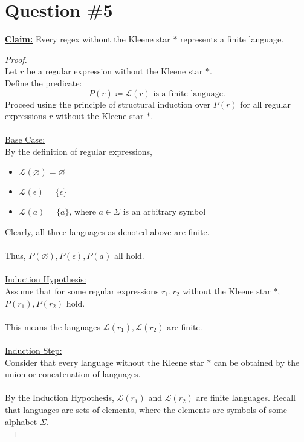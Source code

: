 \documentclass[12pt]{article}
\begin{document}
\section*{Question \#5}
\textbf{\underline{Claim:}} Every regex without the Kleene star \( * \) represents a finite language.
\begin{proof}
\leavevmode\\
    Let \( r \) be a regular expression without the Kleene star \( * \). \\
    Define the predicate:
    \[
        P(r) \coloneq \mathcal{L}(r) \text{ is a finite language.}
    \]
    Proceed using the principle of structural induction over \( P(r) \) for all regular expressions \( r \) without the Kleene star \( *\). \\
    \\
    \underline{Base Case:} \\
    By the definition of regular expressions,
    \begin{itemize}
        \item \( \mathcal{L}(\varnothing) = \varnothing \)
        \item \( \mathcal{L}(\epsilon) = \{ \epsilon \} \)
        \item \( \mathcal{L}(a) = \{ a \} \), where \( a \in \Sigma \) is an arbitrary symbol 
    \end{itemize}
    Clearly, all three languages as denoted above are finite. \\
    \\
    Thus, \( P(\varnothing), P(\epsilon), P(a) \) all hold. \\
    \\
    \underline{Induction Hypothesis:} \\
    Assume that for some regular expressions \( r_1, r_2 \) without the Kleene star \( * \), \( P(r_1), P(r_2) \) hold. \\
    \\
    This means the languages \( \mathcal{L}(r_1), \mathcal{L}(r_2) \) are finite. \\
    \\
    \underline{Induction Step:} \\
    Consider that every language without the Kleene star \( * \) can be obtained by the union or concatenation of languages. \\
    \\
    By the Induction Hypothesis, \( \mathcal{L}(r_1) \) and \( \mathcal{L}(r_2) \) are finite languages. Recall that languages are sets of elements, where the elements are symbols of some alphabet \( \Sigma \). \\

\end{proof}
\end{document}
